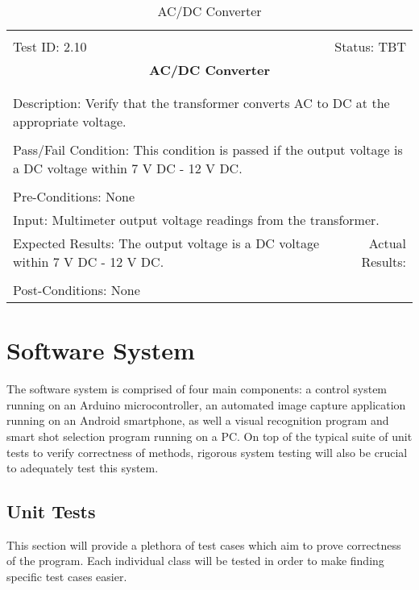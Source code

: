 \documentclass[titlepage]{article}
\begin{document}
\begin{center}%
\begin{table}
\begin{tabular}{|l r|}\hline&\\[-2mm]
	Test ID: 2.10	&Status: TBT\\[-3mm]
	\multicolumn{2}{|c|}{\textbf{\large{AC/DC Converter}}}\\&\\\hline&\\[-3mm]
	\multicolumn{2}{|p{\textwidth}|}{Description: Verify that the transformer converts AC to DC at the appropriate voltage.}\\[1mm]\hline&\\[-3mm]
	\multicolumn{2}{|p{\textwidth}|}{Pass/Fail Condition: This condition is passed if the output voltage is a DC voltage within 7 V DC - 12 V DC.}\\[1mm]\hline&\\[-3mm]
	\multicolumn{2}{|p{\textwidth}|}{Pre-Conditions: None}\\[4mm]
	\multicolumn{2}{|p{\textwidth}|}{Input: Multimeter output voltage readings from the transformer.}\\[2mm]\hline
	\multicolumn{1}{|p{0.49\textwidth}}{Expected Results: The output voltage is a DC voltage within 7 V DC - 12 V DC.}	&\multicolumn{1}{|p{0.45\textwidth}|}{Actual Results:}\\\hline&\\[-3mm]
	\multicolumn{2}{|p{\textwidth}|}{Post-Conditions: None}\\\hline
\end{tabular}
\caption{AC/DC Converter}
\end{table}
\end{center}


\section{Software System}
The software system is comprised of four main components: a control system running on an Arduino microcontroller, an automated image capture application running on an Android smartphone, as well a visual recognition program and smart shot selection program running on a PC. On top of the typical suite of unit tests to verify correctness of methods, rigorous system testing will also be crucial to adequately test this system.

\subsection{Unit Tests}
This section will provide a plethora of test cases which aim to prove correctness of the program. Each individual class will be tested in order to make finding specific test cases easier.
\end{document}
